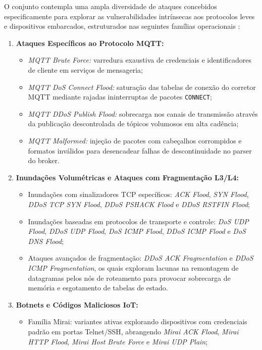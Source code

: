 O conjunto contempla uma ampla diversidade de ataques concebidos especificamente para explorar as vulnerabilidades intrínsecas aos protocolos leves e dispositivos embarcados, estruturados nas seguintes famílias operacionais \cite{sasi2025efficient}:
\begin{enumerate}
    \item \textbf{Ataques Específicos ao Protocolo MQTT:}
    \begin{itemize}
        \item \emph{MQTT Brute Force:} varredura exaustiva de credenciais e identificadores de cliente em serviços de mensageria;
        \item \emph{MQTT DoS Connect Flood:} saturação das tabelas de conexão do corretor MQTT mediante rajadas ininterruptas de pacotes \texttt{CONNECT};
        \item \emph{MQTT DDoS Publish Flood:} sobrecarga nos canais de transmissão através da publicação descontrolada de tópicos volumosos em alta cadência;
        \item \emph{MQTT Malformed:} injeção de pacotes com cabeçalhos corrompidos e formatos inválidos para desencadear falhas de descontinuidade no parser do broker.
    \end{itemize}
    \item \textbf{Inundações Volumétricas e Ataques com Fragmentação L3/L4:}
    \begin{itemize}
        \item Inundações com sinalizadores TCP específicos: \emph{ACK Flood}, \emph{SYN Flood}, \emph{DDoS TCP SYN Flood}, \emph{DDoS PSHACK Flood} e \emph{DDoS RSTFIN Flood};
        \item Inundações baseadas em protocolos de transporte e controle: \emph{DoS UDP Flood}, \emph{DDoS UDP Flood}, \emph{DoS ICMP Flood}, \emph{DDoS ICMP Flood} e \emph{DoS DNS Flood};
        \item Ataques avançados de fragmentação: \emph{DDoS ACK Fragmentation} e \emph{DDoS ICMP Fragmentation}, os quais exploram lacunas na remontagem de datagramas pelos nós de roteamento para provocar sobrecarga de memória e esgotamento de tabelas de estado.
    \end{itemize}
    \item \textbf{Botnets e Códigos Maliciosos IoT:}
    \begin{itemize}
        \item Família Mirai: variantes ativas explorando dispositivos com credenciais padrão em portas Telnet/SSH, abrangendo \emph{Mirai ACK Flood}, \emph{Mirai HTTP Flood}, \emph{Mirai Host Brute Force} e \emph{Mirai UDP Plain};

\end{itemize}
\end{enumerate}
